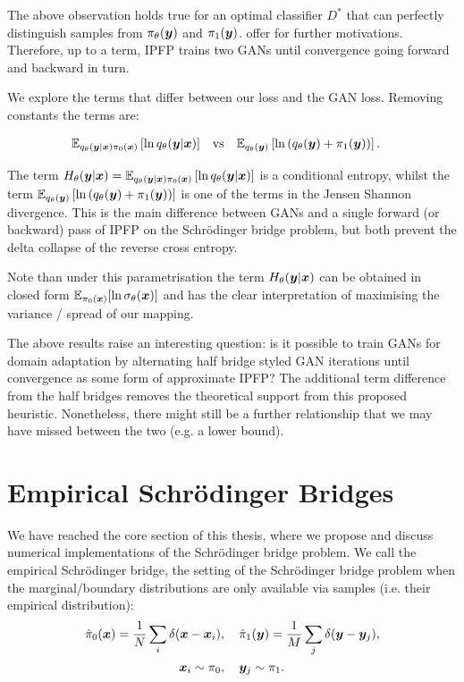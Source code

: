 \documentclass[a4paper,12pt,twoside,openright]{report}
\theoremstyle{definition}
\begin{document}
The above observation holds true for an optimal classifier $D^{*}$ that can perfectly distinguish samples from $\pi_\theta({\bm{y}})$ and $\pi_1({\bm{y}})$. \cite{mohamed2016learning} offer for further motivations. Therefore, up to a term, IPFP trains two GANs until convergence going forward and backward in turn.

We explore the terms that differ between our loss and the GAN loss. Removing constants the terms are:

\begin{align}
 \mathbb{E}_{q_{\theta}({\bm{y}}|{\bm{x}})\pi_0({\bm{x}})}\left[ \operatorname{ln} q_{\theta}({\bm{y}}|{\bm{x}}) \right]\quad &\text{vs} \quad  \mathbb{E}_{q_{\theta}({\bm{y}})}\left[\operatorname{ln}\left(q_{\theta}({\bm{y}}) + \pi_1({\bm{y}})\right)\right].
\end{align}

The term $H_{\theta}({\bm{y}}|{\bm{x}}) =\mathbb{E}_{q_{\theta}({\bm{y}}|{\bm{x}})\pi_0({\bm{x}})}\left[ \operatorname{ln} q_{\theta}({\bm{y}}|{\bm{x}}) \right]$ is a conditional entropy, whilst the term $\mathbb{E}_{q_{\theta}({\bm{y}})}\left[\operatorname{ln}\left(q_{\theta}({\bm{y}}) + \pi_1({\bm{y}})\right)\right]$ is one of the terms in the Jensen Shannon divergence. This is the main difference between GANs and a single forward (or backward) pass of IPFP on the Schrödinger bridge problem, but both prevent the delta collapse of the reverse cross entropy.

Note than under this parametrisation the term $H_{\theta}({\bm{y}}|{\bm{x}})$ can be obtained in closed form $\mathbb{E}_{\pi_0({\bm{x}})}[\operatorname{ln} {\sigma}_{\theta}({\bm{x}})]$ and has the clear interpretation of maximising the variance / spread of our mapping.
 
The above results raise an interesting question: is it possible to train GANs for domain adaptation by alternating  half bridge styled GAN iterations until convergence as some form of approximate IPFP? The additional term difference from the half bridges removes the theoretical support from this proposed heuristic. Nonetheless, there might still be a further relationship that we may have missed between the two (e.g. a lower bound).



\chapter{Empirical Schrödinger Bridges}

We have reached the core section of this thesis, where we propose and discuss numerical implementations of the Schrödinger bridge problem. We call the empirical Schrödinger bridge, the setting of the Schrödinger bridge problem when the marginal/boundary distributions are only available via samples (i.e. their empirical distribution):
\begin{align}
    \hat{\pi}_0({\bm{x}})  = \frac{1}{N}\sum_i \delta({\bm{x}} -{\bm{x}}_i) &, \quad\hat{\pi}_1({\bm{y}})  = \frac{1}{M}\sum_j \delta({\bm{y}} -{\bm{y}}_j), \nonumber\\
    {\bm{x}}_i \sim \pi_0 &, \quad {\bm{y}}_j \sim \pi_1.
\end{align}
\end{document}
